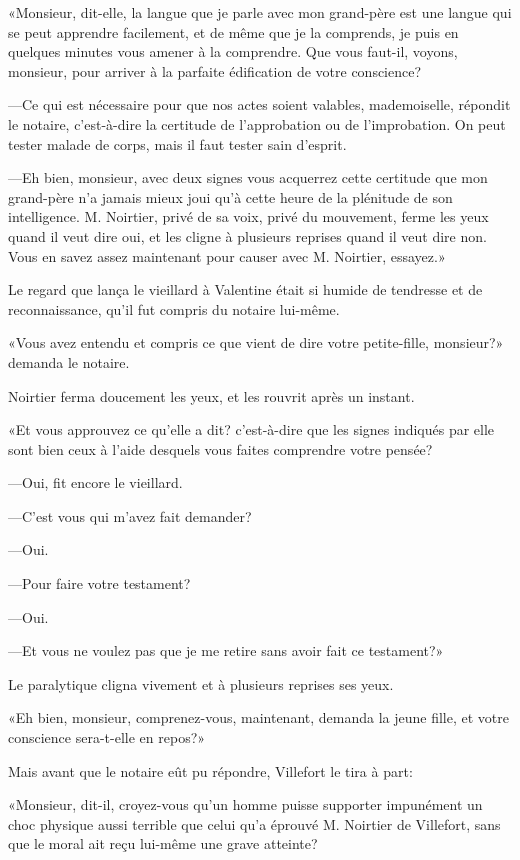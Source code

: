 «Monsieur, dit-elle, la langue que je parle avec mon grand-père est une langue qui se peut apprendre facilement, et de même que je la comprends, je puis en quelques minutes vous amener à la comprendre. Que vous faut-il, voyons, monsieur, pour arriver à la parfaite édification de votre conscience? 

—Ce qui est nécessaire pour que nos actes soient valables, mademoiselle, répondit le notaire, c'est-à-dire la certitude de l'approbation ou de l'improbation. On peut tester malade de corps, mais il faut tester sain d'esprit. 

—Eh bien, monsieur, avec deux signes vous acquerrez cette certitude que mon grand-père n'a jamais mieux joui qu'à cette heure de la plénitude de son intelligence. M. Noirtier, privé de sa voix, privé du mouvement, ferme les yeux quand il veut dire oui, et les cligne à plusieurs reprises quand il veut dire non. Vous en savez assez maintenant pour causer avec M. Noirtier, essayez.» 

Le regard que lança le vieillard à Valentine était si humide de tendresse et de reconnaissance, qu'il fut compris du notaire lui-même. 

«Vous avez entendu et compris ce que vient de dire votre petite-fille, monsieur?» demanda le notaire. 

Noirtier ferma doucement les yeux, et les rouvrit après un instant. 

«Et vous approuvez ce qu'elle a dit? c'est-à-dire que les signes indiqués par elle sont bien ceux à l'aide desquels vous faites comprendre votre pensée? 

—Oui, fit encore le vieillard. 

—C'est vous qui m'avez fait demander? 

—Oui.  

—Pour faire votre testament? 

—Oui. 

—Et vous ne voulez pas que je me retire sans avoir fait ce testament?» 

Le paralytique cligna vivement et à plusieurs reprises ses yeux. 

«Eh bien, monsieur, comprenez-vous, maintenant, demanda la jeune fille, et votre conscience sera-t-elle en repos?» 

Mais avant que le notaire eût pu répondre, Villefort le tira à part: 

«Monsieur, dit-il, croyez-vous qu'un homme puisse supporter impunément un choc physique aussi terrible que celui qu'a éprouvé M. Noirtier de Villefort, sans que le moral ait reçu lui-même une grave atteinte? 

